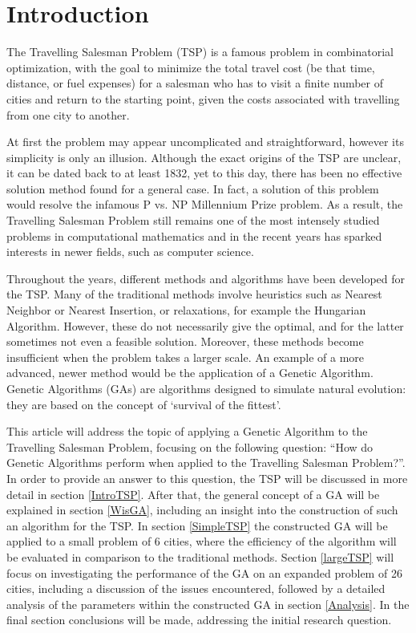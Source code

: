 \newpage 
\section{Introduction}

\par
The Travelling Salesman Problem (TSP) is a famous problem in combinatorial optimization, with the goal to minimize the total travel cost (be that time, distance, or fuel expenses) for a salesman who has to visit a finite number of cities and return to the starting point, given the costs associated with travelling from one city to another.

\par
At first the problem may appear uncomplicated and straightforward, however its simplicity is only an illusion. Although the exact origins of the TSP are unclear, it can be dated back to at least 1832, yet to this day, there has been no effective solution method found for a general case. In fact, a solution of this problem would resolve the infamous P vs. NP Millennium Prize problem. As a result, the Travelling Salesman Problem still remains one of the most intensely studied problems in computational mathematics and in the recent years has sparked interests in newer fields, such as computer science.

\par
Throughout the years, different methods and algorithms have been developed for the TSP. Many of the traditional methods involve heuristics such as Nearest Neighbor or Nearest Insertion, or relaxations, for example the Hungarian Algorithm. However, these do not necessarily give the optimal, and for the latter sometimes not even a feasible solution. Moreover, these methods become insufficient when the problem takes a larger scale. An example of a more advanced, newer method would be the application of a Genetic Algorithm. Genetic Algorithms (GAs) are algorithms designed to simulate natural evolution: they are based on the concept of `survival of the fittest'.

\par
This article will address the topic of applying a Genetic Algorithm to the Travelling Salesman Problem, focusing on the following question: ``How do Genetic Algorithms perform when applied to the Travelling Salesman Problem?''. In order to provide an answer to this question, the TSP will be discussed in more detail in section \ref{IntroTSP}. After that, the general concept of a GA will be explained in section \ref{WisGA}, including an insight into the construction of such an algorithm for the TSP. In section \ref{SimpleTSP} the constructed GA will be applied to a small problem of 6 cities, where the efficiency of the algorithm will be evaluated in comparison to the traditional methods. Section \ref{largeTSP} will focus on investigating the performance of the GA on an expanded problem of 26 cities, including a discussion of the issues encountered, followed by a detailed analysis of the parameters within the constructed GA in section \ref{Analysis}. In the final section conclusions will be made, addressing the initial research question.



